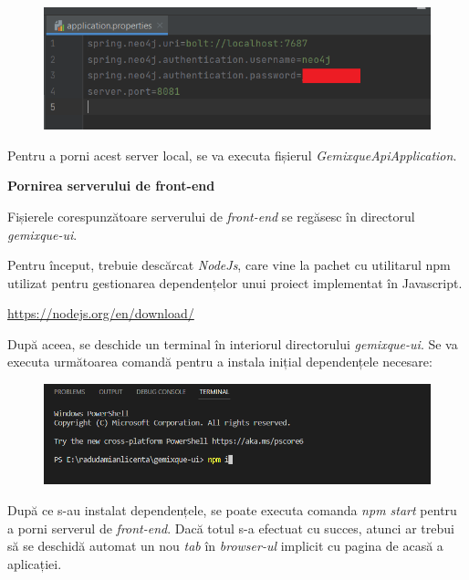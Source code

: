 \documentclass[12pt,a4paper]{report}
\begin{document}
        \begin{figure}[H]
\centering
\caption{}
\begin{adjustbox}{max size={\textwidth}{\textheight}}
\includegraphics[scale=0.8]{exemplu_51_credentiale_backend}
\end{adjustbox}
\caption*{}
\end{figure}

Pentru a porni acest server local, se va executa fișierul \emph{GemixqueApiApplication}.

\bigskip
\textbf{Pornirea serverului de front-end}
\bigskip

Fișierele corespunzătoare serverului de \emph{front-end} se regăsesc în directorul \emph{gemixque-ui}.

Pentru început, trebuie descărcat \emph{NodeJs}, care vine la pachet cu utilitarul npm utilizat pentru gestionarea dependențelor unui proiect implementat în Javascript.

\url{https://nodejs.org/en/download/}

După aceea, se deschide un terminal în interiorul directorului \emph{gemixque-ui}. Se va executa următoarea comandă pentru a instala inițial dependențele necesare:

        \begin{figure}[H]
\centering
\caption{}
\begin{adjustbox}{max size={\textwidth}{\textheight}}
\includegraphics[scale=0.8]{exemplu_50_npm}
\end{adjustbox}
\caption*{}
\end{figure}

După ce s-au instalat dependențele, se poate executa comanda \emph{npm start} pentru a porni serverul de \emph{front-end}. Dacă totul s-a efectuat cu succes, atunci ar trebui să se deschidă automat un nou \emph{tab} în \emph{browser-ul} implicit cu pagina de acasă a aplicației.
\end{document}
